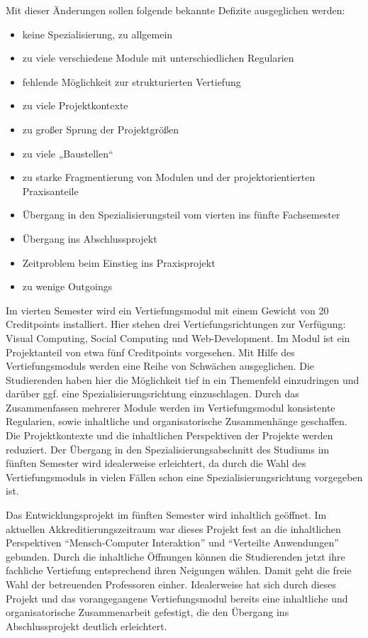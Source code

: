 Mit dieser Änderungen sollen folgende bekannte Defizite ausgeglichen
werden:

\begin{itemize}
\tightlist
\item
  keine Spezialisierung, zu allgemein
\item
  zu viele verschiedene Module mit unterschiedlichen Regularien
\item
  fehlende Möglichkeit zur strukturierten Vertiefung
\item
  zu viele Projektkontexte
\item
  zu großer Sprung der Projektgrößen
\item
  zu viele „Baustellen``
\item
  zu starke Fragmentierung von Modulen und der projektorientierten
  Praxisanteile
\item
  Übergang in den Spezialisierungsteil vom vierten ins fünfte
  Fachsemester
\item
  Übergang ins Abschlussprojekt
\item
  Zeitproblem beim Einstieg ins Praxisprojekt
\item
  zu wenige Outgoings
\end{itemize}

Im vierten Semester wird ein Vertiefungsmodul mit einem Gewicht von 20
Creditpoints installiert. Hier stehen drei Vertiefungsrichtungen zur
Verfügung: Visual Computing, Social Computing und Web-Development. Im
Modul ist ein Projektanteil von etwa fünf Creditpoints vorgesehen. Mit
Hilfe des Vertiefungsmoduls werden eine Reihe von Schwächen
ausgeglichen. Die Studierenden haben hier die Möglichkeit tief in ein
Themenfeld einzudringen und darüber ggf. eine Spezialisierungsrichtung
einzuschlagen. Durch das Zusammenfassen mehrerer Module werden im
Vertiefungsmodul konsistente Regularien, sowie inhaltliche und
organisatorische Zusammenhänge geschaffen. Die Projektkontexte und die
inhaltlichen Perspektiven der Projekte werden reduziert. Der Übergang in
den Spezialisierungsabschnitt des Studiums im fünften Semester wird
idealerweise erleichtert, da durch die Wahl des Vertiefungsmoduls in
vielen Fällen schon eine Spezialisierungsrichtung vorgegeben ist.

Das Entwicklungsprojekt im fünften Semester wird inhaltlich geöffnet. Im
aktuellen Akkreditierungszeitraum war dieses Projekt fest an die
inhaltlichen Perspektiven ``Mensch-Computer Interaktion'' und
``Verteilte Anwendungen'' gebunden. Durch die inhaltliche Öffnungen
können die Studierenden jetzt ihre fachliche Vertiefung entsprechend
ihren Neigungen wählen. Damit geht die freie Wahl der betreuenden
Professoren einher. Idealerweise hat sich durch dieses Projekt und das
vorangegangene Vertiefungsmodul bereits eine inhaltliche und
organisatorische Zusammenarbeit gefestigt, die den Übergang ins
Abschlussprojekt deutlich erleichtert.

